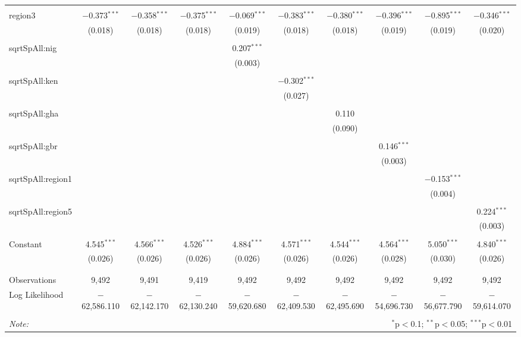 \begin{table}[!htbp]
\begin{tabular}{@{\extracolsep{5pt}}lccccccccc}
  & & & & & & & & & \\ 
 region3 & $-$0.373$^{***}$ & $-$0.358$^{***}$ & $-$0.375$^{***}$ & $-$0.069$^{***}$ & $-$0.383$^{***}$ & $-$0.380$^{***}$ & $-$0.396$^{***}$ & $-$0.895$^{***}$ & $-$0.346$^{***}$ \\ 
  & (0.018) & (0.018) & (0.018) & (0.019) & (0.018) & (0.018) & (0.019) & (0.019) & (0.020) \\ 
  & & & & & & & & & \\ 
 sqrtSpAll:nig &  &  &  & 0.207$^{***}$ &  &  &  &  &  \\ 
  &  &  &  & (0.003) &  &  &  &  &  \\ 
  & & & & & & & & & \\ 
 sqrtSpAll:ken &  &  &  &  & $-$0.302$^{***}$ &  &  &  &  \\ 
  &  &  &  &  & (0.027) &  &  &  &  \\ 
  & & & & & & & & & \\ 
 sqrtSpAll:gha &  &  &  &  &  & 0.110 &  &  &  \\ 
  &  &  &  &  &  & (0.090) &  &  &  \\ 
  & & & & & & & & & \\ 
 sqrtSpAll:gbr &  &  &  &  &  &  & 0.146$^{***}$ &  &  \\ 
  &  &  &  &  &  &  & (0.003) &  &  \\ 
  & & & & & & & & & \\ 
 sqrtSpAll:region1 &  &  &  &  &  &  &  & $-$0.153$^{***}$ &  \\ 
  &  &  &  &  &  &  &  & (0.004) &  \\ 
  & & & & & & & & & \\ 
 sqrtSpAll:region5 &  &  &  &  &  &  &  &  & 0.224$^{***}$ \\ 
  &  &  &  &  &  &  &  &  & (0.003) \\ 
  & & & & & & & & & \\ 
 Constant & 4.545$^{***}$ & 4.566$^{***}$ & 4.526$^{***}$ & 4.884$^{***}$ & 4.571$^{***}$ & 4.544$^{***}$ & 4.564$^{***}$ & 5.050$^{***}$ & 4.840$^{***}$ \\ 
  & (0.026) & (0.026) & (0.026) & (0.026) & (0.026) & (0.026) & (0.028) & (0.030) & (0.026) \\ 
  & & & & & & & & & \\ 
\hline \\[-1.8ex] 
Observations & 9,492 & 9,491 & 9,419 & 9,492 & 9,492 & 9,492 & 9,492 & 9,492 & 9,492 \\ 
Log Likelihood & $-$62,586.110 & $-$62,142.170 & $-$62,130.240 & $-$59,620.680 & $-$62,409.530 & $-$62,495.690 & $-$54,696.730 & $-$56,677.790 & $-$59,614.070 \\ 
\hline 
\hline \\[-1.8ex] 
\textit{Note:}  & \multicolumn{9}{r}{$^{*}$p$<$0.1; $^{**}$p$<$0.05; $^{***}$p$<$0.01} \\ 
\end{tabular} 
\end{table} 
